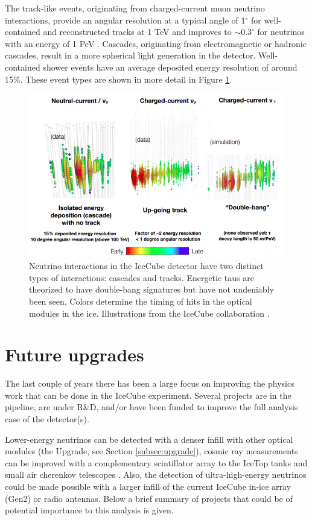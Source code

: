 The track-like events, originating from charged-current muon neutrino interactions, provide an angular resolution at a typical angle of 1$^\circ$ for well-contained and reconstructed tracks at 1 TeV and improves to $\sim 0.3^\circ$ for neutrinos with an energy of 1 PeV \cite{Aartsen:2018ywr}. Cascades, originating from electromagnetic or hadronic cascades, result in a more spherical light generation in the detector. Well-contained shower events have an average deposited energy resolution of around 15\%. These event types are shown in more detail in Figure \ref{fig:ICinteractions2}.
 

\begin{figure}
\centering
\includegraphics[width=\textwidth]{chapter4/img/ICinteractions2.png}
\caption{Neutrino interactions in the IceCube detector have two distinct types of interactions: cascades and tracks. Energetic taus are theorized to have double-bang signatures but have not undeniably been seen. Colors determine the timing of hits in the optical modules in the ice. Illustrations from the IceCube collaboration \cite{kjeroSignatures}.}
\label{fig:ICinteractions2}
\end{figure}


\section{Future upgrades}
The last couple of years there has been a large focus on improving the physics work that can be done in the IceCube experiment. Several projects are in the pipeline, are under R\&D, and/or have been funded to improve the full analysis case of the detector(s).

Lower-energy neutrinos can be detected with a denser infill with other optical modules (the Upgrade, see Section \ref{subsec:upgrade}), cosmic ray measurements can be improved with a complementary scintillator array to the IceTop tanks \cite{Collaboration:2017tdy} and small air cherenkov telescopes \cite{Auffenberg:2017vwc}. Also, the detection of ultra-high-energy neutrinos could be made possible with a larger infill of the current IceCube in-ice array (Gen2) or radio antennas. Below a brief summary of projects that could be of potential importance to this analysis is given.

